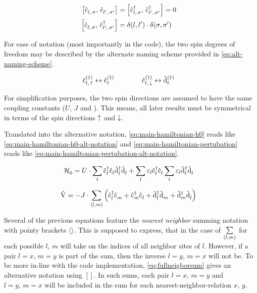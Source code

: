 \begin{equation}
    \label{eq:commutation-relations}
    \begin{split}
        \left[\withspinop[]{l}{\sigma}{},\,\withspinop[]{l'}{\sigma'}{}\right] &= 
        \left[\withspinop[]{l}{\sigma}{\dagger},\,\withspinop[]{l'}{\sigma'}{\dagger}\right] = 0\\
        \left[\withspinop[]{l}{\sigma}{},\,\withspinop[]{l'}{\sigma'}{\dagger}\right] &= \delta(l,l')\cdot\delta(\sigma,\sigma') 
    \end{split}
\end{equation}

For ease of notation (most importantly in the code), the two spin degrees of freedom may be described by the alternate naming scheme provided in \autoref{eq:alt-naming-scheme}.

\begin{equation}
    \label{eq:alt-naming-scheme}
    \withspinop{l}{\up}{(\dagger)} \leftrightarrow \cop{l}{(\dagger)}
    \qquad\qquad
    \withspinop{l}{\down}{(\dagger)} \leftrightarrow \dop{l}{(\dagger)}
\end{equation}

For simplification purposes, the two spin directions are assumed to have the same coupling constants ($U$, $J$ and \epsl).
This means, all later results must be symmetrical in terms of the spin directions $\up$ and $\down$.


Translated into the alternative notation, \autoref{eq:main-hamiltonian-h0} reads like \autoref{eq:main-hamiltonian-h0-alt-notation} and \autoref{eq:main-hamiltonian-pertubation} reads like \autoref{eq:main-hamiltonian-pertubation-alt-notation}.

\begin{equation}
    \label{eq:main-hamiltonian-h0-alt-notation}
    \HzeroHamiltonian = U \cdot \lsum \cop[]{l}{\dagger}\cop[]{l}{} \dop[]{l}{\dagger}\dop[]{l}{} + \lsum\epsl \cop[]{l}{\dagger}\cop[]{l}{} \lsum\epsl \dop[]{l}{\dagger}\dop[]{l}{}
\end{equation}

\begin{equation}
    \label{eq:main-hamiltonian-pertubation-alt-notation}
    \Vhamiltonian =  - J \cdot \neighborsum{l}{m} \left(\cop[]{l}{\dagger}\cop[]{m}{} +\cop[]{m}{\dagger}\cop[]{l}{} + \dop[]{l}{\dagger}\dop[]{m}{} +\dop[]{m}{\dagger}\dop[]{l}{} \right)
\end{equation}

Several of the previous equations feature the \emph{nearest neighbor} summing notation with pointy brackets $\langle\rangle$.
This is supposed to express, that in the case of $\neighborsum[]{l}{m}$ for each possible $l$, $m$ will take on the indices of all neighbor sites of $l$.
However, if a pair $l=x,\,m=y$ is part of the sum, then the inverse $l=y,\,m=x$ will not be.
To be more in-line with the code implementation, \autoref{eq:fullneigborsum} gives an alternative notation using $[]$.
In such sums, each pair $l=x,\,m=y$ and $l=y,\,m=x$ will be included in the sum for each nearest-neighbor-relation $x,\,y$.


